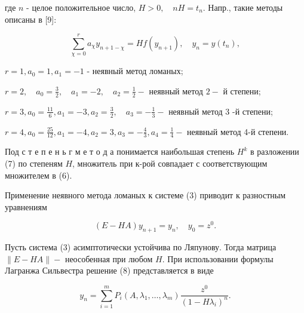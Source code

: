 \documentclass[10pt]{article}
\begin{document}
где $n$ - целое положительное число, $H>0, \quad n H=t_{n}$. Напр., такие методы описаны в [9]:



\[

\sum_{\chi=0}^{r} a_{\chi} y_{n+1-\chi}=H f\left(y_{n+1}\right), \quad y_{n}=y\left(t_{n}\right),

\]



$r=1, a_{0}=1, a_{1}=-1$ - неявный метод ломаных;



$r=2, \quad a_{0}=\frac{3}{2}, \quad a_{1}=-2, \quad a_{2}=\frac{1}{2}-$ неявный метод $2-$ й степени;



$r=3, a_{0}=\frac{11}{6}, a_{1}=-3, a_{2}=\frac{3}{2}, \quad a_{3}=-\frac{1}{3}-$ неявный метод 3 -й степени;



$r=4, a_{0}=\frac{25}{12}, a_{1}=-4, a_{2}=3, a_{3}=-\frac{4}{3}, a_{4}=\frac{1}{4}-$ неявный метод 4-й степени.



Под с т е п е н ь г м е т о д а понимается наибольшая степень $H^{k}$ в разложении (7) по степеням $H$, множитель при к-рой совпадает с соответствующим множителем в (6).



Применение неявного метода ломаных к системе (3) приводит к разностным уравнениям



\[

(E-H A) y_{n+1}=y_{n}, \quad y_{0}=z^{0} .

\]



Пусть система (3) асимптотически устойчива по Ляпунову. Тогда матрица $\|E-H A\|-$ неособенная при любом $H$. При использовании формулы Лагранжа Сильвестра решение (8) представляется в виде



\[

y_{n}=\sum_{i=1}^{m} P_{i}\left(A, \lambda_{1}, \ldots, \lambda_{m}\right) \frac{z^{0}}{\left(1-H \lambda_{i}\right)^{n}} .

\]
\end{document}
